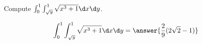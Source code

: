 \documentclass{ximera}
\author{David Guichard \and Neal Koblitz \and H. Jerome Keisler \and Albert Scheller \and Barry Balof \and Mike Wills \and Matthew Carr}
\begin{document}
\begin{exercise}




Compute $\int_{0}^{1}\int_{\sqrt{y}}^{1}\sqrt{x^3+1}\d x\d y$.
\begin{prompt}
\[
\int_{0}^{1}\int_{\sqrt{y}}^{1}\sqrt{x^3+1}\d x\d y=\answer{\frac{2}{9}(2\sqrt{2}-1)}
\]
\end{prompt}



\end{exercise}
\end{document}
